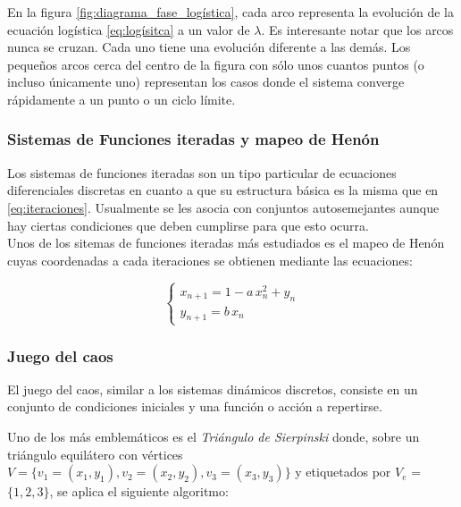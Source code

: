 \documentclass[letterpaper,12pt,oneside]{book}
\begin{document}
En la figura \ref{fig:diagrama_fase_logística}, cada arco representa la evolución de la ecuación logística \ref{eq:logísitca} a un valor de $\lambda$. Es interesante notar que los arcos nunca se cruzan. Cada uno tiene una evolución diferente a las demás.
Los pequeños arcos cerca del centro de la figura con sólo unos cuantos puntos (o incluso únicamente uno) representan los casos donde el sistema converge rápidamente a un punto o un ciclo límite.

\subsubsection{Sistemas de Funciones iteradas y mapeo de Henón}

Los sistemas de funciones iteradas son un tipo particular de ecuaciones diferenciales discretas en cuanto a que su estructura básica es la misma que en \ref{eq:iteraciones}. Usualmente se les asocia con conjuntos autosemejantes aunque hay ciertas condiciones que deben cumplirse para que esto ocurra. 
\\

Unos de los sitemas de funciones iteradas más estudiados es el mapeo de Henón cuyas coordenadas a cada iteraciones se obtienen mediante las ecuaciones:

\begin{equation}
    \begin{cases}
    x_{n+1} = 1 - a \, x_{n}^{2} + y_{n} \\
    y_{n+1} = b \, x_{n}
    \end{cases}
    \label{eq:henon}
\end{equation}



\subsubsection{Juego del caos}

El juego del caos, similar a los sistemas dinámicos discretos, consiste en un conjunto de condiciones iniciales y una función o acción a repertirse.

Uno de los más emblemáticos es el \textit{Triángulo de Sierpinski} donde, sobre un triángulo equilátero con vértices $V = \{ v_{1} = (x_{1}, y_{1}), v_{2} = (x_{2}, y_{2}), v_{3} = (x_{3}, y_{3}) \}$ y etiquetados por $V_{e}$ = \( \{1,2,3\} \), se aplica el siguiente algoritmo:
\end{document}
